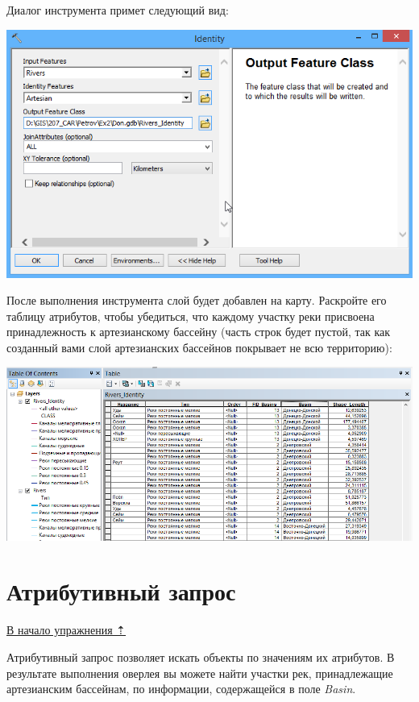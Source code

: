\documentclass[]{book}
\theoremstyle{definition}
\theoremstyle{definition}
\theoremstyle{definition}
\theoremstyle{remark}
\begin{document}
\begin{enumerate}
  Диалог инструмента примет следующий вид:

  \includegraphics{images/Ex06/image20.png}
\end{enumerate}

После выполнения инструмента слой будет добавлен на карту. Раскройте его
таблицу атрибутов, чтобы убедиться, что каждому участку реки присвоена
принадлежность к артезианскому бассейну (часть строк будет пустой, так
как созданный вами слой артезианских бассейнов покрывает не всю
территорию):

\includegraphics{images/Ex06/image21.png}

\hypertarget{map-ref-hydrogeologic-attributes}{%
\section{Атрибутивный запрос}\label{map-ref-hydrogeologic-attributes}}

\protect\hyperlink{map-ref-hydrogeologic}{В начало упражнения ⇡}

Атрибутивный запрос позволяет искать объекты по значениям их атрибутов.
В результате выполнения оверлея вы можете найти участки рек,
принадлежащие артезианским бассейнам, по информации, содержащейся в поле
\emph{Basin}.
\end{document}
